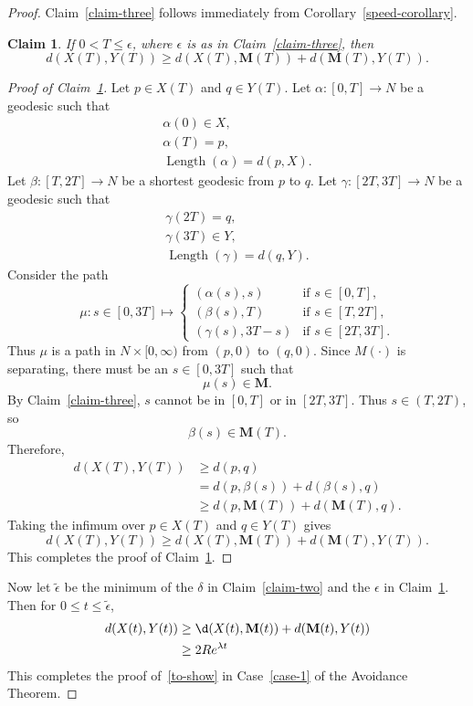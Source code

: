\documentclass{amsart}
\newcommand{\MMM}{\mathbf M}
\newcommand{\eps}{\epsilon}
\newcommand{\Length}{\operatorname{Length}}
\newtheorem{claim}{Claim}
\theoremstyle{definition}
\theoremstyle{definition}
\begin{document}
\begin{proof}
Claim~\ref{claim-three} follows immediately from Corollary~\ref{speed-corollary}.

\begin{claim}\label{claim-four}
If $0<T\le \eps$, where $\eps$ is as in Claim~\ref{claim-three},
then
\[
    d(X(T),Y(T)) \ge d(X(T), \MMM(T)) + d(\MMM(T),Y(T)).
\]
\end{claim}

\begin{proof}[Proof of Claim~\ref{claim-four}]
Let $p\in X(T)$ and $q\in Y(T)$.  
Let $\alpha:[0,T]\to N$ be a geodesic such that
\begin{gather*}
\alpha(0)\in X, \\
\alpha(T)=p, \\
\Length(\alpha) = d(p,X).
\end{gather*}
Let $\beta:[T,2T]\to N$ be a shortest geodesic from $p$ to $q$.
Let $\gamma:[2T,3T]\to N$ be a geodesic such that
\begin{gather*}
\gamma(2T)=q, \\
\gamma(3T)\in Y, \\
\Length(\gamma)= d(q, Y).
\end{gather*}
Consider the path
\[
\mu: s\in [0,3T]
\mapsto
\begin{cases}
(\alpha(s),s)  &\text{if $s\in [0,T]$}, \\
(\beta(s),T)   &\text{if $s\in [T,2T]$}, \\
(\gamma(s), 3T-s)  &\text{if $s\in [2T,3T]$}.
\end{cases}
\]
Thus $\mu$ is a path in $N\times [0,\infty)$ from $(p,0)$ to $(q,0)$.
Since $M(\cdot)$ is separating, there must be an $s\in [0,3T]$ such
that 
\[
    \mu(s) \in \MMM.
\]
By Claim~\ref{claim-three}, $s$ cannot be in $[0,T]$ or in $[2T,3T]$.
Thus $s \in (T,2T)$, so
\[
   \beta(s) \in \MMM(T).
\]
Therefore,
\begin{align*}
d(X(T),Y(T)) 
&\ge
d(p,q)  \\
&=
d(p,\beta(s)) + d(\beta(s),q) \\
&\ge
d(p,\MMM(T)) + d(\MMM(T),q).
\end{align*}
Taking the infimum over $p\in X(T)$ and $q\in Y(T)$ gives
\[
 d(X(T),Y(T)) \ge d(X(T),\MMM(T)) + d(\MMM(T),Y(T)).
\]
This completes the proof of Claim~\ref{claim-four}.
\end{proof}

Now let $\tilde \eps$ be the minimum of 
the $\delta$ in Claim~\ref{claim-two} and the $\eps$ in Claim~\ref{claim-four}.
Then for $0\le t\le \tilde \eps$,
\begin{align*}
d(X(t),Y(t)) 
&\ge
\d(X(t),\MMM(t)) + d(\MMM(t),Y(t)) 
\\
&\ge
2R e^{\lambda t}
\end{align*}
This completes the proof of~\ref{to-show} in Case~\ref{case-1} of the Avoidance Theorem.


\end{proof}
\end{document}
